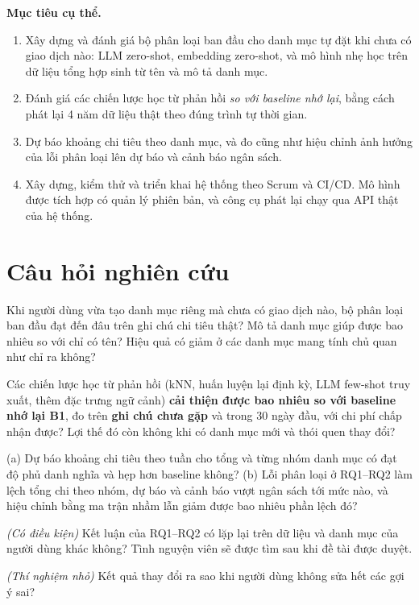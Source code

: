 \documentclass[12pt,a4paper]{article}
\begin{document}
\noindent\textbf{Mục tiêu cụ thể.}
\begin{enumerate}
  \item Xây dựng và đánh giá bộ phân loại ban đầu cho danh mục tự đặt khi chưa có giao dịch nào: LLM zero-shot, embedding zero-shot, và mô hình nhẹ học trên dữ liệu tổng hợp sinh từ tên và mô tả danh mục.
  \item Đánh giá các chiến lược học từ phản hồi \emph{so với baseline nhớ lại}, bằng cách phát lại 4 năm dữ liệu thật theo đúng trình tự thời gian.
  \item Dự báo khoảng chi tiêu theo danh mục, và đo cũng như hiệu chỉnh ảnh hưởng của lỗi phân loại lên dự báo và cảnh báo ngân sách.
  \item Xây dựng, kiểm thử và triển khai hệ thống theo Scrum và CI/CD. Mô hình được tích hợp có quản lý phiên bản, và công cụ phát lại chạy qua API thật của hệ thống.
\end{enumerate}

\section{Câu hỏi nghiên cứu}

\begin{description}[style=nextline,leftmargin=1.2cm]
  \item[RQ1] Khi người dùng vừa tạo danh mục riêng mà chưa có giao dịch nào, bộ phân loại ban đầu đạt đến đâu trên ghi chú chi tiêu thật? Mô tả danh mục giúp được bao nhiêu so với chỉ có tên? Hiệu quả có giảm ở các danh mục mang tính chủ quan như \citet{li2023synthetic} chỉ ra không?
  \item[RQ2] Các chiến lược học từ phản hồi (kNN, huấn luyện lại định kỳ, LLM few-shot truy xuất, thêm đặc trưng ngữ cảnh) \textbf{cải thiện được bao nhiêu so với baseline nhớ lại B1}, đo trên \textbf{ghi chú chưa gặp} và trong 30 ngày đầu, với chi phí chấp nhận được? Lợi thế đó còn không khi có danh mục mới và thói quen thay đổi?
  \item[RQ3] (a) Dự báo khoảng chi tiêu theo tuần cho tổng và từng nhóm danh mục có đạt độ phủ danh nghĩa và hẹp hơn baseline không? (b) Lỗi phân loại ở RQ1--RQ2 làm lệch tổng chi theo nhóm, dự báo và cảnh báo vượt ngân sách tới mức nào, và hiệu chỉnh bằng ma trận nhầm lẫn giảm được bao nhiêu phần lệch đó?
  \item[RQ4] \emph{(Có điều kiện)} Kết luận của RQ1--RQ2 có lặp lại trên dữ liệu và danh mục của người dùng khác không? Tình nguyện viên sẽ được tìm sau khi đề tài được duyệt.
  \item[TN5] \emph{(Thí nghiệm nhỏ)} Kết quả thay đổi ra sao khi người dùng không sửa hết các gợi ý sai?
\end{description}
\end{document}
